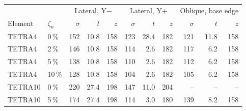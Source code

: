 \begin{tabular}{llrrrrrrrrr}
\toprule
& & \multicolumn{3}{c}{Lateral, Y$-$} & \multicolumn{3}{c}{Lateral, Y+} & \multicolumn{3}{c}{Oblique, base edge} \\
Element & $\zeta_n$ & $\sigma$ & $t$ & $z$ & $\sigma$ & $t$ & $z$ & $\sigma$ & $t$ & $z$ \\
\midrule
TETRA4 & 0\,\% & 152 & 10.8 & 158 & 123 & 28.4 & 182 & 121 & 11.8 & 158 \\
TETRA4 & 2\,\% & 146 & 10.8 & 158 & 114 & 2.6 & 182 & 117 & 6.2 & 158 \\
TETRA4 & 5\,\% & 138 & 10.8 & 158 & 110 & 2.6 & 182 & 112 & 6.2 & 158 \\
TETRA4 & 10\,\% & 128 & 10.8 & 158 & 104 & 2.6 & 182 & 105 & 6.2 & 158 \\
TETRA10 & 0\,\% & 220 & 27.4 & 198 & 147 & 11.0 & 204 & -- & -- & -- \\
TETRA10 & 5\,\% & 174 & 27.4 & 198 & 114 & 3.0 & 180 & 139 & 8.2 & 158 \\
\bottomrule
\end{tabular}
